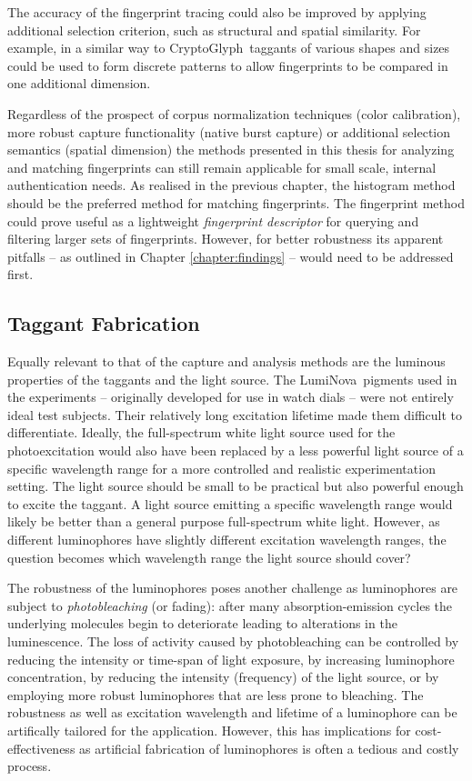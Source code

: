 \documentclass[thesis.tex]{subfiles}
\begin{document}
The accuracy of the fingerprint tracing could also be improved by applying additional selection criterion, such as structural and spatial similarity. For example, in a similar way to CryptoGlyph\textregistered\ taggants of various shapes and sizes could be used to form discrete patterns to allow fingerprints to be compared in one additional dimension.

Regardless of the prospect of corpus normalization techniques (color calibration), more robust capture functionality (native burst capture) or additional selection semantics (spatial dimension) the methods presented in this thesis for analyzing and matching fingerprints can still remain applicable for small scale, internal authentication needs. As realised in the previous chapter, the histogram method should be the preferred method for matching fingerprints. The fingerprint method could prove useful as a lightweight \emph{fingerprint descriptor} for querying and filtering larger sets of fingerprints. However, for better robustness its apparent pitfalls -- as outlined in Chapter \ref{chapter:findings} -- would need to be addressed first.

\subsection{Taggant Fabrication}

Equally relevant to that of the capture and analysis methods are the luminous properties of the taggants and the light source. The LumiNova\textregistered\ pigments used in the experiments -- originally developed for use in watch dials -- were not entirely ideal test subjects. Their relatively long excitation lifetime made them difficult to differentiate. Ideally, the full-spectrum white light source used for the photoexcitation would also have been replaced by a less powerful light source of a specific wavelength range for a more controlled and realistic experimentation setting. The light source should be small to be practical but also powerful enough to excite the taggant. A light source emitting a specific wavelength range would likely be better than a general purpose full-spectrum white light. However, as different luminophores have slightly different excitation wavelength ranges, the question becomes which wavelength range the light source should cover?

The robustness of the luminophores poses another challenge as luminophores are subject to \emph{photobleaching} (or fading): after many absorption-emission cycles the underlying molecules begin to deteriorate leading to alterations in the luminescence. The loss of activity caused by photobleaching can be controlled by reducing the intensity or time-span of light exposure, by increasing luminophore concentration, by reducing the intensity (frequency) of the light source, or by employing more robust luminophores that are less prone to bleaching. The robustness as well as excitation wavelength and lifetime of a luminophore can be artifically tailored for the application. However, this has implications for cost-effectiveness as artificial fabrication of luminophores is often a tedious and costly process.
\end{document}
